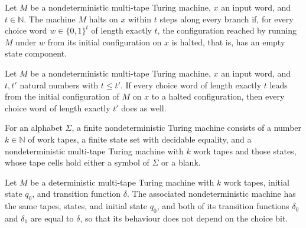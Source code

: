 \begin{definition}
\label{Turing.NDTM.HaltsWithin}
\leanok
{}
Let $M$ be a nondeterministic multi-tape Turing machine, $x$ an input word, and
$t \in \mathbb{N}$.  The machine $M$ halts on $x$ within $t$ steps along every branch if,
for every choice word $w \in \{0,1\}^t$ of length exactly $t$, the configuration reached by
running $M$ under $w$ from its initial configuration on $x$ is halted, that is, has an
empty state component.
\end{definition}

\begin{theorem}
\label{Turing.NDTM.HaltsWithin.mono}
\leanok
{}
Let $M$ be a nondeterministic multi-tape Turing machine, $x$ an input word, and $t,t'$
natural numbers with $t\le t'$. If every choice word of length exactly $t$ leads from
the initial configuration of $M$ on $x$ to a halted configuration, then every choice
word of length exactly $t'$ does as well.
\end{theorem}

\begin{definition}
\label{Turing.FinNDTM}
\leanok
{}
For an alphabet $\Sigma$, a finite nondeterministic Turing machine consists of a number
$k \in \mathbb{N}$ of work tapes, a finite state set with decidable equality, and a
nondeterministic multi-tape Turing machine with $k$ work tapes and those states, whose tape
cells hold either a symbol of $\Sigma$ or a blank.
\end{definition}

\begin{definition}
\label{Turing.MultiTapeTM.toNDTM}
\leanok
{}
Let $M$ be a deterministic multi-tape Turing machine with $k$ work tapes, initial state
$q_0$, and transition function $\delta$.  The associated nondeterministic machine has the
same tapes, states, and initial state $q_0$, and both of its transition functions
$\delta_0$ and $\delta_1$ are equal to $\delta$, so that its behaviour does not depend on
the choice bit.
\end{definition}

